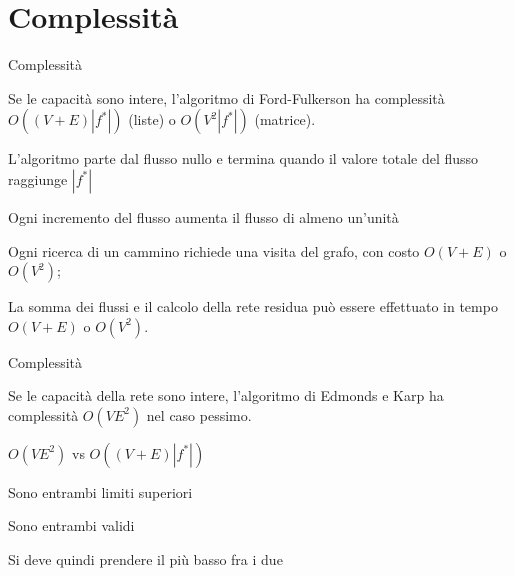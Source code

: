 \section{Complessità}


\begin{frame}{Complessità}

\vspace{-3pt}
\begin{myboxtitle}
Se le capacità sono \alert	{intere}, l'algoritmo di Ford-Fulkerson
ha complessità \alert{$O((V+E)|f^*|)$} (liste) o \alert{$O(V^2|f^*|)$} (matrice).
\end{myboxtitle}

\BIL
\item L'algoritmo parte dal flusso nullo e termina quando il valore totale
del flusso raggiunge $|f^*|$
\item Ogni incremento del flusso aumenta il flusso di almeno un'unità
\item Ogni ricerca di un cammino richiede una visita del grafo, con
costo $O(V+E)$ o $O(V^2)$; 
\item La somma dei flussi e il calcolo della rete residua può essere 
effettuato in tempo $O(V+E)$ o $O(V^2)$.
\EIL

\end{frame}

\begin{frame}{Complessità}

\vspace{-3pt}
\begin{myboxtitle}
Se le capacità della rete sono \alert{intere}, l'algoritmo di Edmonds e Karp
ha complessità \alert{$O(VE^2)$} nel caso pessimo.
\end{myboxtitle}


\BIL
\item $O(VE^2)$ vs $O((V+E)|f^*|)$
\item Sono entrambi limiti superiori
\item Sono entrambi validi
\item Si deve quindi prendere il più basso fra i due
\EIL

\end{frame}


